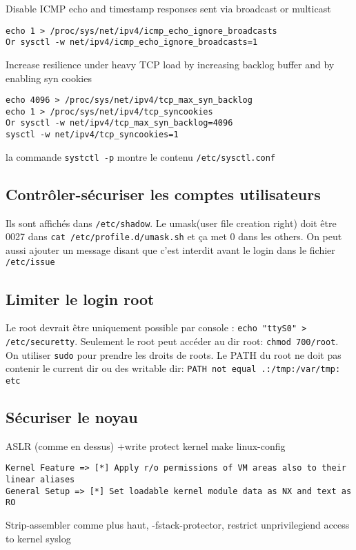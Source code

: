 Disable ICMP echo and timestamp responses sent via broadcast or multicast
\begin{lstlisting}[style=bash]
echo 1 > /proc/sys/net/ipv4/icmp_echo_ignore_broadcasts
Or sysctl -w net/ipv4/icmp_echo_ignore_broadcasts=1
\end{lstlisting}
Increase resilience under heavy TCP load by increasing backlog buffer and by enabling 
syn cookies
\begin{lstlisting}[style=bash]
echo 4096 > /proc/sys/net/ipv4/tcp_max_syn_backlog
echo 1 > /proc/sys/net/ipv4/tcp_syncookies
Or sysctl -w net/ipv4/tcp_max_syn_backlog=4096
sysctl -w net/ipv4/tcp_syncookies=1
\end{lstlisting}
la commande \verb!systctl -p! montre le contenu \verb!/etc/sysctl.conf!

\subsection{Contrôler-sécuriser les comptes utilisateurs}
Ils sont affichés dans \verb!/etc/shadow!. Le umask(user file creation right) doit être 0027 dans \verb!cat /etc/profile.d/umask.sh! et ça met 0 dans les others.
On peut aussi ajouter un message disant que c'est interdit avant le login dans le fichier \verb!/etc/issue!

\subsection{Limiter le login root}
Le root devrait être uniquement possible par console : \verb!echo "ttyS0" > /etc/securetty!. Seulement le root peut accéder au dir root: \verb!chmod 700/root!. On utiliser \verb!sudo! pour prendre les droits de roots. Le PATH du root ne doit pas contenir le current dir ou des writable dir: \verb!PATH not equal .:/tmp:/var/tmp: etc! 
\subsection{Sécuriser le noyau}
ASLR (comme en dessus) +write protect kernel make linux-config
\begin{lstlisting}[style=bash]
Kernel Feature => [*] Apply r/o permissions of VM areas also to their linear aliases
General Setup => [*] Set loadable kernel module data as NX and text as RO
\end{lstlisting}
Strip-assembler comme plus haut, -fstack-protector, restrict unprivilegiend access to kernel syslog

